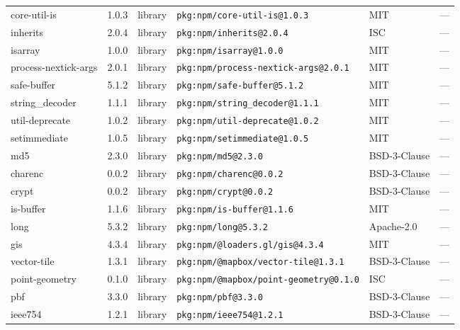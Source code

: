 \documentclass[11pt,a4paper]{article}
\begin{document}
\begin{longtable}{|p{4cm}|p{2cm}|p{1.6cm}|p{5cm}|p{1.5cm}|p{3.5cm}|}
\raggedright core-util-is & 1.0.3 & library & \small\texttt{pkg:npm/core-util-is@1.0.3} & MIT & \small — \\
\raggedright inherits & 2.0.4 & library & \small\texttt{pkg:npm/inherits@2.0.4} & ISC & \small — \\
\raggedright isarray & 1.0.0 & library & \small\texttt{pkg:npm/isarray@1.0.0} & MIT & \small — \\
\raggedright process-nextick-args & 2.0.1 & library & \small\texttt{pkg:npm/process-nextick-args@2.0.1} & MIT & \small — \\
\raggedright safe-buffer & 5.1.2 & library & \small\texttt{pkg:npm/safe-buffer@5.1.2} & MIT & \small — \\
\raggedright string\_decoder & 1.1.1 & library & \small\texttt{pkg:npm/string\_decoder@1.1.1} & MIT & \small — \\
\raggedright util-deprecate & 1.0.2 & library & \small\texttt{pkg:npm/util-deprecate@1.0.2} & MIT & \small — \\
\raggedright setimmediate & 1.0.5 & library & \small\texttt{pkg:npm/setimmediate@1.0.5} & MIT & \small — \\
\raggedright md5 & 2.3.0 & library & \small\texttt{pkg:npm/md5@2.3.0} & BSD-3-Clause & \small — \\
\raggedright charenc & 0.0.2 & library & \small\texttt{pkg:npm/charenc@0.0.2} & BSD-3-Clause & \small — \\
\raggedright crypt & 0.0.2 & library & \small\texttt{pkg:npm/crypt@0.0.2} & BSD-3-Clause & \small — \\
\raggedright is-buffer & 1.1.6 & library & \small\texttt{pkg:npm/is-buffer@1.1.6} & MIT & \small — \\
\raggedright long & 5.3.2 & library & \small\texttt{pkg:npm/long@5.3.2} & Apache-2.0 & \small — \\
\raggedright gis & 4.3.4 & library & \small\texttt{pkg:npm/@loaders.gl/gis@4.3.4} & MIT & \small — \\
\raggedright vector-tile & 1.3.1 & library & \small\texttt{pkg:npm/@mapbox/vector-tile@1.3.1} & BSD-3-Clause & \small — \\
\raggedright point-geometry & 0.1.0 & library & \small\texttt{pkg:npm/@mapbox/point-geometry@0.1.0} & ISC & \small — \\
\raggedright pbf & 3.3.0 & library & \small\texttt{pkg:npm/pbf@3.3.0} & BSD-3-Clause & \small — \\
\raggedright ieee754 & 1.2.1 & library & \small\texttt{pkg:npm/ieee754@1.2.1} & BSD-3-Clause & \small — \\

\end{longtable}
\end{document}
